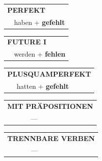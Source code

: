\documentclass[10pt,a4paper]{revtex4-2}
\begin{document}
\begin{verbbox}
    \vspace{10pt}

 \begin{tabular}{rl}
     \multicolumn{2}{l}{\textbf{PERFEKT}}\\
    &haben + \textbf{gefehlt}\\
  \end{tabular}
\hfill
   \begin{tabular}{rl}
   
    \multicolumn{2}{l}{\textbf{FUTURE I} }\\
   & werden + \textbf{fehlen}\\
 
  \end{tabular}
\hfill
   \begin{tabular}{rl}
      \multicolumn{2}{l}{\textbf{PLUSQUAMPERFEKT}}\\
    &hatten + \textbf{gefehlt}\\
  \end{tabular}
  
  \vspace{10pt}

\begin{tabular}{lll}
\multicolumn{3}{l}{\textbf{MIT PRÄPOSITIONEN}}\\
& ---\\
\end{tabular}
\hfill
\begin{tabular}{lll}
\multicolumn{3}{l}{\textbf{TRENNBARE VERBEN}}\\
& ---\\
\end{tabular}

  \vspace{-5pt}

\end{verbbox}
\end{document}

